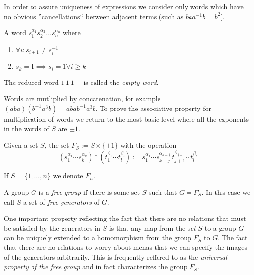 In order to assure uniqueness of expressions we consider only words which have no obvious ''cancellations`` between adjacent terms (such as \(baa^{-1}b = b^2\)).

\begin{definition}
   A word \(s_1^{\alpha_1}s_2^{\alpha_2}\ldots s_n^{\alpha_n}\) where
   \begin{enumerate}[label=\roman*, align=Center]
      \item \(\forall i: s_{i+1} \neq s_i^{-1}\)
      \item \(s_k = 1 \implies s_i = 1 \forall i \geq k\)
   \end{enumerate}
\end{definition}
\begin{remark}
   The reduced word \(1~1~1~\cdots\) is called the \emph{empty word}.
\end{remark}

Words are mutliplied by concatenation, for example \((aba)(b^{-1}a^3b) = abab^{-1}a^3b\).
To prove the associative property for multiplication of words we return to the most basic level where all the exponents in the words of \(S\) are \(\pm 1\).

\begin{definition}
   Given a set \(S\), the set \(F_S := S \times \{\pm 1\}\) with the operation
   \[(s_1^{\alpha_1}\cdots s_k^{\alpha_k}) \ast (t_1^{\beta_1}\cdots t_l^{\beta_l}) := s_1^{\alpha_1}\cdots s_{k-j}^{\alpha_{k-j}}~t_{j+1}^{\beta_{j+1}}\cdots t_l^{\beta_l}\]
\end{definition}
\begin{remark}[Notation]
   If \(S = \{1, \ldots, n\}\) we denote \(F_n\).
\end{remark}
\begin{remark}[Terminology]
   A group \(G\) is a \emph{free group} if there is some set \(S\) such that \(G = F_S\).
   In this case we call \(S\) a set of \emph{free generators} of \(G\).
\end{remark}

One important property reflecting the fact that there are no relations that must be satisfied by the generators in \(S\) is that any map from the \emph{set} \(S\) to a group \(G\) can be uniquely extended to a homomorphism from the group \(F_S\) to \(G\).
The fact that there are no relations to worry about menas that we can specify the images of the generators arbitrarily.
This is frequently reffered to as the \emph{universal property of the free group} and in fact characterizes the group \(F_S\).

